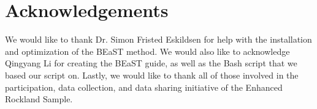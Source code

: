 \section*{Acknowledgements}
  We would like to thank Dr. Simon Fristed Eskildsen for help with the installation and optimization of the BEaST method. We would also like to acknowledge Qingyang Li for creating the BEaST guide, as well as the Bash script that we based our script on. Lastly, we would like to thank all of those involved in the participation, data collection, and data sharing initiative of the Enhanced Rockland Sample.
  

\theendnotes
